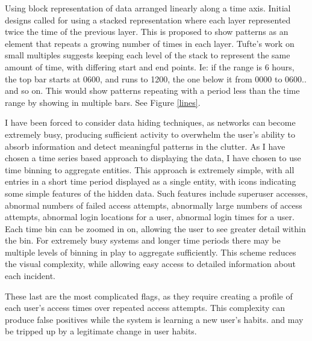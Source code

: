 Using block representation of data arranged linearly along a time axis.
Initial designs called for using a stacked representation where each layer represented twice the time of the previous layer.
This is proposed to show patterns as an element that repeats a growing number of times in each layer.
Tufte's work on small multiples \cite{tufte1983visual} suggests keeping each level of the stack to represent the same amount of time, with differing start and end points. Ie: if the range is 6 hours, the top bar starts at 0600, and runs to 1200, the one below it from 0000 to 0600..  and so on. This would show patterns repeating with a period less than the time range by showing in multiple bars. See Figure \ref{lines}.

I have been forced to consider data hiding techniques, as networks can become extremely busy, producing sufficient activity to overwhelm the user's ability to absorb information and detect meaningful patterns in the clutter. As I have chosen a time series based approach to displaying the data, I have chosen to use time binning to aggregate entities. This approach is extremely simple, with all entries in a short time period displayed as a single entity, with icons indicating some simple features of the hidden data. Such features include superuser accesses, abnormal numbers of failed access attempts, abnormally large numbers of access attempts, abnormal login locations for a user, abnormal login times for a user. Each time bin can be zoomed in on, allowing the user to see greater detail within the bin. For extremely busy systems and longer time periods there may be multiple levels of binning in play to aggregate sufficiently. This scheme reduces the visual complexity, while allowing easy access to detailed information about each incident. 

These last are the most complicated flags, as they require creating a profile of each user's access times over repeated access attempts. This complexity can produce false positives while the system is learning a new user's habits. and may be tripped up by a legitimate change in user habits.


